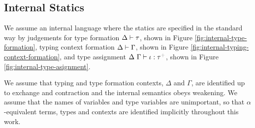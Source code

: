 \documentclass[12pt]{article}
\newcommand{\moutput}{^{\color{gray}+}}
\newtheorem{assumption}{Assumption}
\begin{document}
\subsection{Internal Statics}
We assume an internal language where the statics are specified in the standard way by judgements for  type formation {$\Delta \vdash \tau$}, shown in Figure \ref{fig:internal-type-formation}, typing context formation { $\Delta \vdash \Gamma$}, shown in Figure \ref{fig:internal-typing-context-formation}, and type assignment {$\iDelta~\iGamma \vdash \iota : \tau\moutput$}, shown in Figure \ref{fig:internal-type-asignment}. 







We assume that typing and type formation contexts, $\Delta$ and $\Gamma$, are identified up to exchange and contraction and the internal semantics obeys weakening. We assume that the names of variables and type variables are unimportant, so that $\alpha$-equivalent terms, types and contexts are identified implicitly throughout this work. 
\end{document}
